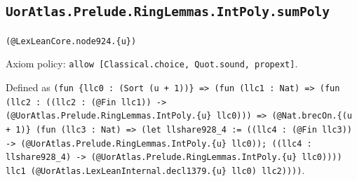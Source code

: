 \documentclass[11pt]{article}
\begin{document}
\subsection*{\texttt{UorAtlas.Prelude.RingLemmas.IntPoly.sumPoly}}
\noindent\texttt{(@LexLeanCore.node924.\{u\})}\par
\noindent Axiom policy: \texttt{allow [Classical.choice, Quot.sound, propext]}.\par
\noindent Defined as \texttt{(fun \{llc0 : (Sort (u + 1))\} => (fun (llc1 : Nat) => (fun (llc2 : ((llc2 : (@Fin llc1)) -> (@UorAtlas.Prelude.RingLemmas.IntPoly.\{u\} llc0))) => (@Nat.brecOn.\{(u + 1)\} (fun (llc3 : Nat) => (let llshare928\_4 := ((llc4 : (@Fin llc3)) -> (@UorAtlas.Prelude.RingLemmas.IntPoly.\{u\} llc0)); ((llc4 : llshare928\_4) -> (@UorAtlas.Prelude.RingLemmas.IntPoly.\{u\} llc0)))) llc1 (@UorAtlas.LexLeanInternal.decl1379.\{u\} llc0) llc2))))}.\par
\end{document}

